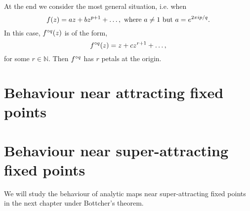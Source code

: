 At the end we consider the most general situation, i.e. when \[
	f(z)=az+bz^{p+1}+\ldots,\text{ where \( a\neq 1 \) but \( a=e^{2 \pi i p/q} \)}
.\]  In this case, \( \fof[q](z) \) is of the form, \[
\fof[q](z)=z+cz^{r+1}+\ldots 
,\] for some \( r\in  \mathbb{N} \). Then \( \fof[q] \)
has \( r \) petals at the origin.

\section{Behaviour near attracting fixed points}

\section{Behaviour near super-attracting fixed points}
We will study the behaviour of analytic maps near super-attracting fixed
points in the next chapter under Bottcher's theorem.

